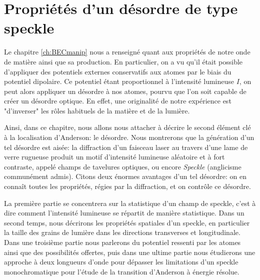 \chapter{Propriétés d'un désordre de type speckle}

Le chapitre \ref{ch:BECmanip} nous a renseigné quant aux propriétés de notre onde de matière ainsi que sa production. En particulier, on a vu qu'il était possible d'appliquer des potentiels externes conservatifs aux atomes par le biais du potentiel dipolaire. Ce potentiel étant proportionnel à l'intensité lumineuse $I$, on peut alors appliquer un désordre à nos atomes, pourvu que l'on soit capable de créer un désordre optique. En effet, une originalité de notre expérience est "d'inverser" les rôles habituels de la matière et de la lumière.

Ainsi, dans ce chapitre, nous allons nous attacher à décrire le second élément clé à la localisation d'Anderson: le désordre. Nous montrerons que la génération d'un tel désordre est aisée: la diffraction d'un faisceau laser au travers d'une lame de verre rugueuse produit un motif d'intensité lumineuse aléatoire et à fort contraste, appelé champs de tavelures optiques, ou encore \emph{Speckle} (anglicisme communément admis). Citons deux énormes avantages d'un tel désordre: on en connaît toutes les propriétés, régies par la diffraction, et on contrôle ce désordre. 

La première partie se concentrera sur la statistique d'un champ de speckle, c'est à dire comment l'intensité lumineuse se répartit de manière statistique. Dans un second temps, nous décrirons les propriétés spatiales d'un speckle, en particulier la taille des grains de lumière dans les directions transverses et longitudinale. Dans une troisième partie nous parlerons du potentiel ressenti par les atomes ainsi que des possibilités offertes, puis dans une ultime partie nous étudierons une approche à deux longueurs d'onde pour dépasser les limitations d'un speckle monochromatique pour l'étude de la transition d'Anderson à énergie résolue.

